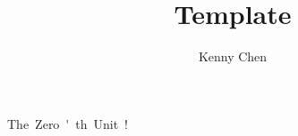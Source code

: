 \documentclass[12pt]{report}
\title{Template}
\author{Kenny Chen}
\begin{document}
\maketitle
\tableofcontents
\newpage

\unit{The Zero'th Unit!}

\end{document}
